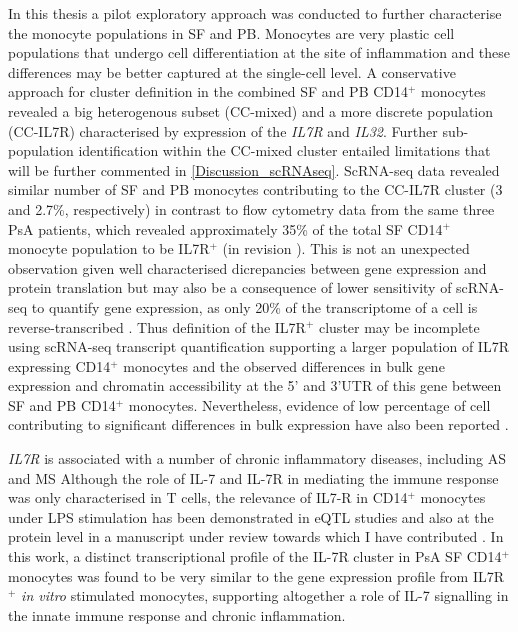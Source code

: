 In this thesis a pilot exploratory approach was conducted to further characterise the monocyte populations in SF and PB. Monocytes are very plastic cell populations that undergo cell differentiation at the site of inflammation and these differences may be better captured at the single-cell level. A conservative approach for cluster definition in the combined SF and PB CD14$^+$ monocytes revealed a big heterogenous subset (CC-mixed) and a more discrete population (CC-IL7R) characterised by expression of the \textit{IL7R} and \textit{IL32}. Further sub-population identification within the CC-mixed cluster entailed limitations that will be further commented in \ref{Discussion_scRNAseq}. ScRNA-seq data revealed similar number of SF and PB monocytes contributing to the CC-IL7R cluster (3 and 2.7\%, respectively) in contrast to flow cytometry data from the same three PsA patients, which revealed approximately 35\% of the total SF CD14$^+$ monocyte population to be IL7R$^+$ (in revision \parencite{Al-Mossawi2018}). This is not an unexpected observation given well characterised dicrepancies between gene expression and protein translation but may also be a consequence of lower sensitivity of scRNA-seq to quantify gene expression, as only 20\% of the transcriptome of a cell is reverse-transcribed \parencite{Liu2016,Islam2014}. Thus definition of the IL7R$^+$ cluster may be incomplete using scRNA-seq transcript quantification supporting a larger population of IL7R expressing CD14$^+$ monocytes and the observed differences in bulk gene expression and chromatin accessibility at the 5' and 3'UTR of this gene between SF and PB CD14$^+$ monocytes. Nevertheless, evidence of low percentage of cell contributing to significant differences in bulk expression have also been reported \parencite{}.

\textit{IL7R} is associated with a number of chronic inflammatory diseases, including AS and MS \parencite{Gregory2007, Cortes2007} Although the role of IL-7 and IL-7R in mediating the immune response was only characterised in T cells, the relevance of IL7-R in CD14$^+$ monocytes under LPS stimulation has been demonstrated in eQTL studies and also at the protein level in a manuscript under review towards which I have contributed \parencite{Fairfax2014, Al-Mossawi2018}. In this work, a distinct transcriptional profile of the IL-7R cluster in PsA SF CD14$^+$ monocytes was found to be very similar to the gene expression profile from IL7R$^+$ \textit{in vitro} stimulated monocytes, supporting altogether a role of IL-7 signalling in the innate immune response and chronic inflammation.

